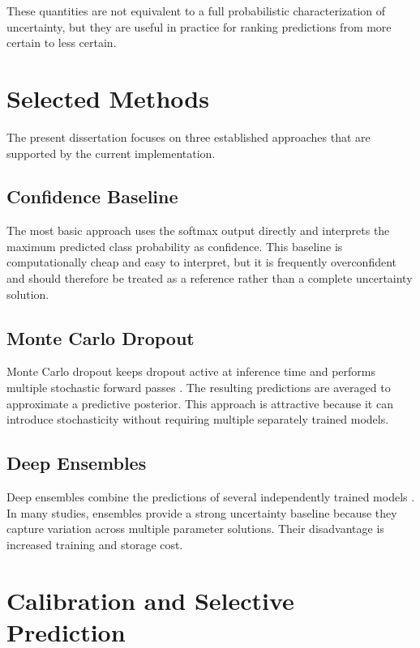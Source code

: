 These quantities are not equivalent to a full probabilistic characterization of uncertainty, but they are useful in practice for ranking predictions from more certain to less certain.

\section{Selected Methods}

The present dissertation focuses on three established approaches that are supported by the current implementation.

\subsection{Confidence Baseline}

The most basic approach uses the softmax output directly and interprets the maximum predicted class probability as confidence. This baseline is computationally cheap and easy to interpret, but it is frequently overconfident and should therefore be treated as a reference rather than a complete uncertainty solution.

\subsection{Monte Carlo Dropout}

Monte Carlo dropout keeps dropout active at inference time and performs multiple stochastic forward passes \cite{gal2016dropout}. The resulting predictions are averaged to approximate a predictive posterior. This approach is attractive because it can introduce stochasticity without requiring multiple separately trained models.

\subsection{Deep Ensembles}

Deep ensembles combine the predictions of several independently trained models \cite{lakshminarayanan2017simple}. In many studies, ensembles provide a strong uncertainty baseline because they capture variation across multiple parameter solutions. Their disadvantage is increased training and storage cost.

\section{Calibration and Selective Prediction}

